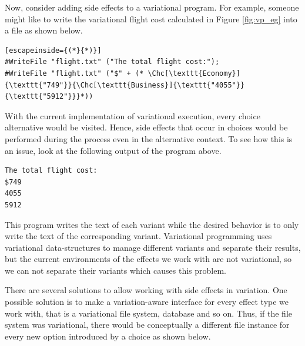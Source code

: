 Now, consider adding side effects to a variational program. For example, someone might like to write the variational flight cost calculated in Figure \ref{fig:vp_eg} into a file as shown below. 
%
\begin{lstlisting}[escapeinside={(*}{*)}]
#WriteFile "flight.txt" ("The total flight cost:");
#WriteFile "flight.txt" ("$" + (* \Chc[\texttt{Economy}]{\texttt{"749"}}{\Chc[\texttt{Business}]{\texttt{"4055"}}{\texttt{"5912"}}}*))
\end{lstlisting}
%
With the current implementation of variational execution, every choice alternative would be visited. Hence, side effects that occur in choices would be performed during the process even in the alternative context. To see how this is an issue, look at the following output of the program above. 
%
\begin{lstlisting}
The total flight cost: 
$749
4055 
5912
\end{lstlisting}
%
This program writes the text of each variant while the desired behavior is to only write the text of the corresponding variant. Variational programming uses variational data-structures to manage different variants and separate their results, but the current environments of the effects we work with are not variational, so we can not separate their variants which causes this problem.

There are several solutions to allow working with side effects in variation. One possible solution is to make a variation-aware interface for every effect type we work with, that is a variational file system, database \cite{ATW17dbpl} and so on. Thus, if the file system was variational, there would be conceptually a different file instance for every new option introduced by a choice as shown below.\\

